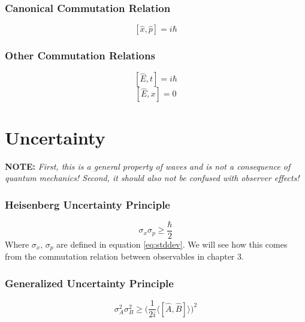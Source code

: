 \subsubsection{Canonical Commutation Relation}
\begin{equation}\label{eq:xp-commute}
    [\hat{x},\hat{p}] = i\hbar
\end{equation}
\subsubsection{Other Commutation Relations}
\begin{equation}\label{eq:et-commute}
    [\hat{E},t] = i\hbar
\end{equation}
\begin{equation}\label{eq:ex-commute}
    [\hat{E},x] = 0
\end{equation}



\section{Uncertainty}
\textbf{NOTE:} \textit{First, this is a general property of waves and is not a consequence of quantum mechanics! Second, it should also not be confused with observer effects!}

\subsubsection{Heisenberg Uncertainty Principle}
\begin{equation}\label{eq:heisenberg-uncertain}
    \sigma_x \sigma_p \geq \frac{\hbar}{2}
\end{equation}
Where $\sigma_x,\, \sigma_p$ are defined in equation \ref{eq:stddev}. We will see how this comes from the commutation relation between observables in chapter 3.
\subsubsection{Generalized Uncertainty Principle}
\begin{equation}\label{eq:gen-uncertain}
    \sigma_A^2\sigma_B^2 \geq \Big(\frac{1}{2i} \Big\langle [\hat{A},\hat{B}] \Big\rangle \Big)^2
\end{equation}



